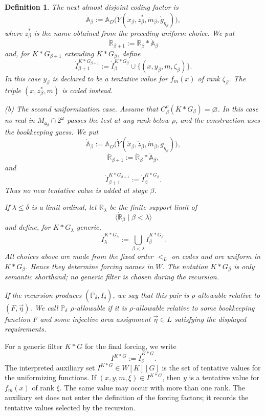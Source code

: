 \documentclass[a4paper,11pt]{article}
\newtheorem{definition}[theorem]{Definition}
\newcommand{\forceP}{\mathbb{P}}
\newcommand{\forceR}{\mathbb{R}}
\newcommand{\forceA}{\mathbb{A}}
\begin{document}
\begin{definition}
The next almost disjoint coding factor is
\[
   \dot{\forceA}_\beta
   :=\mathbb A_D\bigl(
      \dot Y(\dot x_\beta,\dot z_\beta^*,\dot m_\beta,
             \dot g_{\eta_\beta})
   \bigr),
\]
where $\dot z_\beta^*$ is the name obtained from the preceding uniform choice.  We put
\[
   \dot{\forceR}_{\beta+1}
   :=\dot{\forceR}_\beta*\dot{\forceA}_\beta
\]
and, for $K*G_{\beta+1}$ extending $K*G_\beta$, define
\[
   \dot I_{\beta+1}^{K*G_{\beta+1}}
   :=\dot I_\beta^{K*G_\beta}
     \cup\{(x,y_\beta,m,\zeta_\beta)\}.
\]
In this case $y_\beta$ is declared to be a tentative value for $f_m(x)$ of rank $\zeta_\beta$.  The triple $(x,z_\beta^*,m)$ is coded instead.

\medskip
\noindent
\textup{(b) The second uniformization case.}
Assume that $C_\beta^\rho(K*G_\beta)=\varnothing$.  In this case no real in $M_{\mathfrak a_\beta}\cap2^\omega$ passes the test at any rank below $\rho$, and the construction uses the bookkeeping guess.  We put
\[
   \dot{\forceA}_\beta
   :=\mathbb A_D\bigl(
      \dot Y(\dot x_\beta,\dot z_\beta,\dot m_\beta,
             \dot g_{\eta_\beta})
   \bigr),
\]
\[
   \dot{\forceR}_{\beta+1}
   :=\dot{\forceR}_\beta*\dot{\forceA}_\beta,
\]
and
\[
   \dot I_{\beta+1}^{K*G_{\beta+1}}
   :=\dot I_\beta^{K*G_\beta}.
\]
Thus no new tentative value is added at stage $\beta$.

If $\lambda\leq\delta$ is a limit ordinal, let $\dot{\forceR}_\lambda$ be the finite-support limit of
\[
   \langle\dot{\forceR}_\beta\mid\beta<\lambda\rangle
\]
and define, for $K*G_\lambda$ generic,
\[
   \dot I_\lambda^{K*G_\lambda}
   :=\bigcup_{\beta<\lambda}
      \dot I_\beta^{K*G_\beta}.
\]
All choices above are made from the fixed order $<_L$ on codes and are uniform in $K*G_\beta$.  Hence they determine forcing names in $W$.  The notation $K*G_\beta$ is only semantic shorthand; no generic filter is chosen during the recursion.

If the recursion produces $(\forceP_\delta,\dot I_\delta)$, we say that this pair is $\rho$-allowable relative to $(F,\vec\eta)$.  We call $\forceP_\delta$ $\rho$-allowable if it is $\rho$-allowable relative to some bookkeeping function $F$ and some injective area assignment $\vec\eta\in L$ satisfying the displayed requirements.
\end{definition}

For a generic filter $K*G$ for the final forcing, we write
\[
   I^{K*G}:=\dot I_\delta^{K*G}.
\]
The interpreted auxiliary set $I^{K*G}\in W[K][G]$ is the set of tentative values for the uniformizing functions.  If $(x,y,m,\xi)\in I^{K*G}$, then $y$ is a tentative value for $f_m(x)$ of rank $\xi$.  The same value may occur with more than one rank.  The auxiliary set does not enter the definition of the forcing factors; it records the tentative values selected by the recursion.
\end{document}

